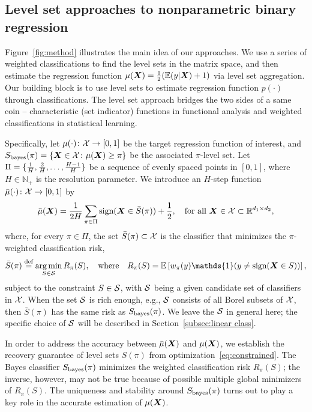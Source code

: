 \documentclass[11pt]{article}
\theoremstyle{plain}
\theoremstyle{definition}
\def\sign{\textup{sign}}
\def\bayesS{S_{\textup{bayes}}}
\begin{document}
\subsection{Level set approaches to nonparametric binary regression}\label{sec:bridge}
Figure~\ref{fig:method} illustrates the main idea of our approaches. We use a series of weighted classifications to find the level sets in the matrix space, and then estimate the regression function $\mu(\bm X)={1\over 2}(\mathbb{E}(y|\bm X)+1)$ via level set aggregation. Our building block is to use level sets to estimate regression function $p(\cdot)$ through classifications. The level set approach bridges the two sides of a same coin -- characteristic (set indicator) functions in functional analysis and weighted classifications in statistical learning. 

Specifically, let $\mu(\cdot)\colon \mathcal{X} \to [0,1]$ be the target regression function of interest, and $\bayesS(\pi)=\{\mX\in \tX\colon \mu(\mX)\geq \pi\}$ be the associated $\pi$-level set. Let $\Pi=\{{1\over H}, {2\over H}, \ldots, {H-1\over H} \}$ be a sequence of evenly spaced points in $[0,1]$, where $H\in\mathbb{N}_{+}$ is the resolution parameter. We introduce an $H$-step function $\bar \mu(\cdot)\colon \mathcal{X} \to [0,1]$ by
\begin{equation}\label{eq:stepfunction}
\bar \mu(\mX)= {1\over 2H}  \sum_{\pi \in \Pi} \sign (\mX\in \bar S(\pi))+{1\over 2}, \quad \text{for all }\mX\in\tX\subset \mathbb{R}^{d_1\times d_2},
\end{equation}
where, for every $\pi\in\Pi$, the set $\bar S(\pi)\subset \mathcal{X}$ is the classifier that minimizes the $\pi$-weighted classification risk,
\begin{equation}\label{eq:constrained}
\bar S(\pi) \stackrel{\text{def}}{=} \argmin_{S\in \tS}R_\pi(S), \quad \text{where}\quad R_\pi(S)=\mathbb{E}\left[ w_{\pi}(y)\mathds{1}(y\neq \sign (\mX\in S))\right],
\end{equation}
subject to the constraint $S\in\mathcal{S}$, with $\mathcal{S}$ being a given candidate set of classifiers in $\mathcal{X}$. When the set $\mathcal{S}$ is rich enough, e.g., $\mathcal{S}$ consists of all Borel subsets of $\mathcal{X}$, then $\bar S(\pi)$ has the same risk as $\bayesS(\pi)$. We leave the $\mathcal{S}$ in general here; the specific choice of $\mathcal{S}$ will be described in Section~\ref{subsec:linear class}. 

In order to address the accuracy between $\bar \mu(\bm X)$ and $\mu(\bm X)$, we establish the recovery guarantee of level sets $S(\pi)$ from optimization~\eqref{eq:constrained}. The Bayes classifier $\bayesS(\pi)$ minimizes the weighted classification risk $R_\pi(S)$; the inverse, however, may not be true because of possible multiple global minimizers of $R_\pi(S)$. The uniqueness and stability around $\bayesS(\pi)$ turns out to play a key role in the accurate estimation of $\mu(\bm X)$. 
\end{document}
